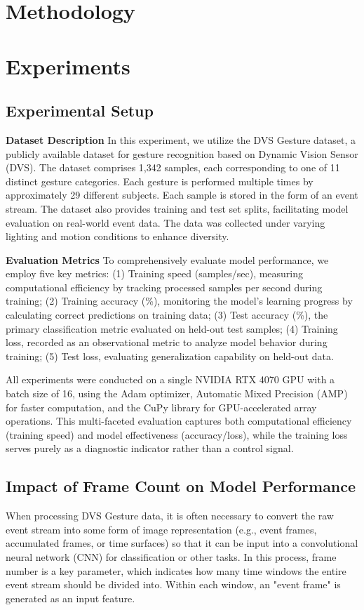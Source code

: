 \documentclass[conference]{IEEEtran}
\begin{document}
\section{Methodology}


\section{Experiments}
\subsection{Experimental Setup}
\textbf{Dataset Description} In this experiment, we utilize the DVS Gesture dataset, a publicly available dataset for gesture recognition based on Dynamic Vision Sensor (DVS). 
The dataset comprises 1,342 samples, each corresponding to one of 11 distinct gesture categories.
Each gesture is performed multiple times by approximately 29 different subjects. 
Each sample is stored in the form of an event stream. 
The dataset also provides training and test set splits, facilitating model evaluation on real-world event data.
The data was collected under varying lighting and motion conditions to enhance diversity.

\textbf{Evaluation Metrics} To comprehensively evaluate model performance, we employ five key metrics: 
(1) Training speed (samples/sec), measuring computational efficiency by tracking processed samples per second during training; 
(2) Training accuracy (\%), monitoring the model's learning progress by calculating correct predictions on training data; 
(3) Test accuracy (\%), the primary classification metric evaluated on held-out test samples;
(4) Training loss, recorded as an observational metric to analyze model behavior during training; 
(5) Test loss, evaluating generalization capability on held-out data. 

All experiments were conducted on a single NVIDIA RTX 4070 GPU with a batch size of 16, using the Adam optimizer, 
Automatic Mixed Precision (AMP) for faster computation, and the CuPy library for GPU-accelerated array operations. 
This multi-faceted evaluation captures both computational efficiency (training speed) and model effectiveness (accuracy/loss), 
while the training loss serves purely as a diagnostic indicator rather than a control signal.

\subsection{Impact of Frame Count on Model Performance}
When processing DVS Gesture data, it is often necessary to convert the raw event stream into some form of 
image representation (e.g., event frames, accumulated frames, or time surfaces) so that it can be input into a 
convolutional neural network (CNN) for classification or other tasks. In this process, frame number is a key parameter, 
which indicates how many time windows the entire event stream should be divided into. 
Within each window, an "event frame" is generated as an input feature.
\end{document}
